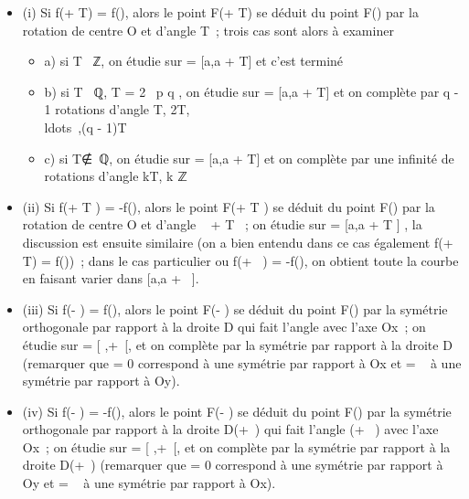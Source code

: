 \begin{itemize}
\itemsep1pt\parskip0pt
\item
  (i) Si f(\theta + T) = f(\theta), alors le point F(\theta + T) se déduit du point
  F(\theta) par la rotation de centre O et d'angle T~; trois cas sont alors à
  examiner

  \begin{itemize}
  \itemsep1pt\parskip0pt
  \item
    a) si T \pi~ℤ, on étudie sur \Delta = {[}a,a + T{]} \bigcapD et c'est terminé
  \item
    b) si T \in \pi~ℚ, T = 2\pi~ p \over q , on étudie sur \Delta
    = {[}a,a + T{]} \bigcapD et on complète par q - 1 rotations d'angle T,
    2T,\\ldots~,(q -
    1)T
  \item
    c) si T∉\pi~ℚ, on étudie sur \Delta = {[}a,a +
    T{]} \bigcapD et on complète par une infinité de rotations d'angle kT, k \in
    ℤ
  \end{itemize}
\item
  (ii) Si f(\theta + T  ) = -f(\theta), alors le point
  F(\theta + T  ) se déduit du point F(\theta) par la
  rotation de centre O et d'angle \pi~ + T  ~; on
  étudie sur \Delta = {[}a,a + T  {]} \bigcapD, la
  discussion est ensuite similaire (on a bien entendu dans ce cas
  également f(\theta + T) = f(\theta))~; dans le cas particulier ou f(\theta + \pi~) =
  -f(\theta), on obtient toute la courbe en faisant varier \theta dans {[}a,a +
  \pi~{]}.
\item
  (iii) Si f(\omega - \theta) = f(\theta), alors le point F(\omega - \theta) se déduit du point
  F(\theta) par la symétrie orthogonale par rapport à la droite
  D\omega{} qui fait l'angle \omega{} avec l'axe Ox~; on étudie sur \Delta =
  {[} \omega {} ,+\infty~{[}\bigcapD, et on complète par la
  symétrie par rapport à la droite D\omega{} (remarquer que \omega = 0
  correspond à une symétrie par rapport à Ox et \omega = \pi~ à une symétrie par
  rapport à Oy).
\item
  (iv) Si f(\omega - \theta) = -f(\theta), alors le point F(\omega - \theta) se déduit du point
  F(\theta) par la symétrie orthogonale par rapport à la droite
  D(\omega+\pi~) qui fait l'angle (\omega + \pi~) avec l'axe Ox~; on
  étudie sur \Delta = {[} \omega {} ,+\infty~{[}\bigcapD, et on
  complète par la symétrie par rapport à la droite D(\omega+\pi~)
  (remarquer que \omega = 0 correspond à une symétrie par rapport à Oy et \omega =
  \pi~ à une symétrie par rapport à Ox).
\end{itemize}

